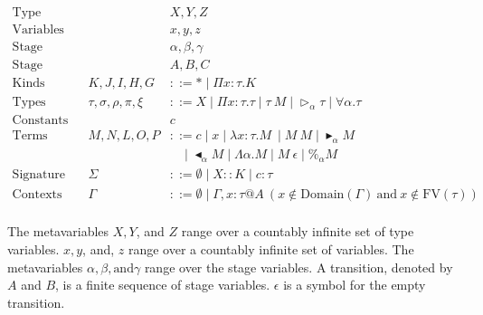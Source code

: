 \documentclass[runningheads]{llncs}
\newcommand{\G}{\Gamma}
\newcommand{\TW}{\triangleright}
\newcommand{\F}{\forall}
\newcommand{\TB}{\blacktriangleright}
\newcommand{\TBL}{\blacktriangleleft}
\begin{document}
\begin{align*}
    \textrm{Type variables}  &   &                          & X,Y,Z                                                                                                      \\
    \textrm{Variables}       &   &                          & x,y,z                                                                                                      \\
    \textrm{Stage variables} &   &                          & \alpha,\beta,\gamma                                                                                        \\
    \textrm{Stage}           &   &                          & A,B,C                                                                                                      \\
    \textrm{Kinds}           &   & K,J,I,H,G                & ::= * \mid \Pi x:\tau.K                                                                                    \\
    \textrm{Types}           &   & \tau,\sigma,\rho,\pi,\xi & ::= X \mid \Pi x:\tau.\tau \mid \tau\ M \mid \TW_{\alpha} \tau \mid \F\alpha.\tau                          \\
    \textrm{Constants}       &   &                          & c                                                                                                          \\
    \textrm{Terms}           &   & M,N,L,O,P                & ::= c \mid x \mid \lambda x:\tau.M\ \mid M\ M \mid \TB_\alpha M                                            \\
                             &   &                          & \ \ \ \ \mid \TBL_\alpha M \mid \Lambda\alpha.M \mid M\ \epsilon \mid \%_\alpha M                          \\  
    \textrm{Signature}       &   & \Sigma                   & ::= \emptyset \mid X::K \mid c:\tau                                                                        \\
    \textrm{Contexts}        &   & \Gamma                   & ::= \emptyset \mid  \Gamma,x:\tau @A\ (x\not\in\textrm{Domain}(\G)\ \text{and}\ x\not\in\textrm{FV}(\tau)) \\
\end{align*}


The metavariables $X, Y$, and $Z$ range over a countably infinite set of type variables.
$x, y$, and, $z$ range over a countably infinite set of variables.
The metavariables $\alpha, \beta, \text{and} \gamma$ range over the stage variables.
A transition, denoted by $A$ and $B$, is a finite sequence of stage variables.
$\epsilon$ is a symbol for the empty transition.
\end{document}
